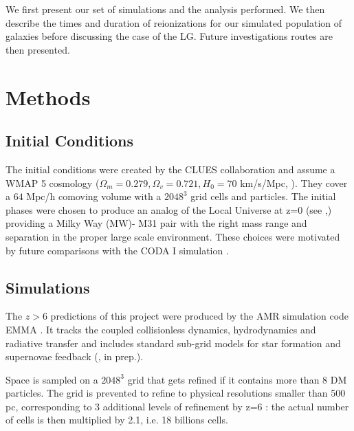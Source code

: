 \documentclass[twocolumn]{aastex61}
\begin{document}
We first present our set of simulations and the analysis performed. We then describe the times and duration of reionizations for our simulated population of galaxies before discussing the case of the LG. Future investigations routes are then presented.

\section{Methods}

\subsection{Initial Conditions}
The initial conditions were created by the CLUES collaboration and assume a WMAP 5 cosmology ($\Omega_m=0.279, \Omega_v=0.721, H_0=70$ km/s/Mpc, \citet{HIN9}). They cover a $64$ Mpc/h comoving volume with a $2048^3$ grid cells and particles.  The initial phases were chosen to produce an analog of the Local Universe at z=0 (see \citet{GOT10},\citet{ILI11}) providing a Milky Way (MW)- M31 pair with the right mass range and separation in the proper large scale environment. These choices were motivated by future comparisons with the CODA I simulation \citep{OCV16}.

\subsection{Simulations}
The $z>6$ predictions of this project were produced by the AMR simulation code EMMA \citep{AUB15}. It tracks the coupled collisionless dynamics, hydrodynamics and radiative transfer and includes standard sub-grid models for star formation and supernovae feedback (\citet{DEP17}, in prep.). 

Space is sampled on a $2048^3$  grid that gets refined if it contains more than 8 DM particles. The grid is prevented to refine to physical resolutions smaller than 500 pc, corresponding to 3 additional levels of refinement by z=6 : the actual number of cells is then multiplied by 2.1, i.e. 18 billions cells. 
\end{document}

